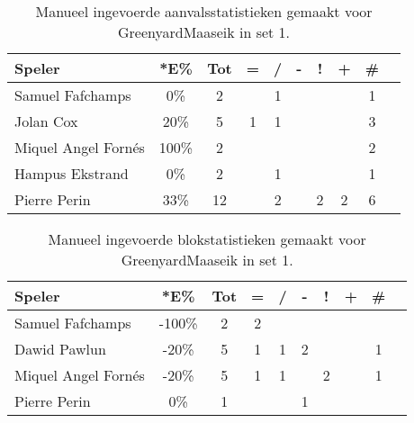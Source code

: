 \begin{table}[ht!]
    \centering
    \scriptsize
    \begin{tabular}{|l|c|c|c|c|c|c|c|c|c|} \hline
        \textbf{Speler} & *E\% & Tot & = & / & - & ! & + & \# \\ \hline
        Samuel Fafchamps & 0\% & 2 &  & 1 &  &  &  & 1 \\ 
        Jolan Cox & 20\% & 5 & 1 & 1 &  &  &  & 3 \\ 
        Miquel Angel Fornés & 100\% & 2 &  &  &  &  &  & 2 \\ 
        Hampus Ekstrand & 0\% & 2 &  & 1 &  &  &  & 1 \\ 
        Pierre Perin & 33\% & 12 &  & 2 &  & 2 & 2 & 6 \\ \hline
    \end{tabular}
    \caption[Manueel ingevoerde aanvalsstatistieken gemaakt Greenyard Maaseik in set 1]{\label{tab:PL3AttMaaseikMan1}Manueel ingevoerde aanvalsstatistieken gemaakt voor GreenyardMaaseik in set 1.}
\end{table}

\begin{table}[ht!]
    \centering
    \scriptsize
    \begin{tabular}{|l|c|c|c|c|c|c|c|c|c|} \hline
        \textbf{Speler} & *E\% & Tot & = & / & - & ! & + & \# \\ \hline
        Samuel Fafchamps & -100\% & 2 & 2 &  &  &  &  & \\ 
        Dawid Pawlun & -20\% & 5 & 1 & 1 & 2 & & & 1 \\ 
        Miquel Angel Fornés & -20\% & 5 & 1 & 1 &  & 2 & & 1 \\
        Pierre Perin & 0\% & 1 &  &  & 1 &  &  &\\ \hline
    \end{tabular}
    \caption[Manueel ingevoerde blokstatistieken gemaakt Greenyard Maaseik in set 1]{\label{tab:PL3BlockMaaseikMan1}Manueel ingevoerde blokstatistieken gemaakt voor GreenyardMaaseik in set 1.}
\end{table}

